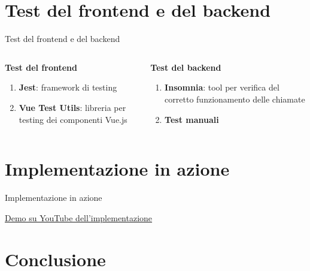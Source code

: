 \documentclass[aspectratio=169]{beamer}
\begin{document}
\section{Test del frontend e del backend}

\begin{frame}{Test del frontend e del backend}
	\begin{columns}[T] %
		\begin{column}{0.5\textwidth}
			\textbf{Test del frontend}
			\begin{enumerate}
				\item \textbf{Jest}: framework di testing
				\item \textbf{Vue Test Utils}: libreria per testing dei componenti Vue.js
			\end{enumerate}
		\end{column}
		\begin{column}{0.5\textwidth}
			\textbf{Test del backend}
			\begin{enumerate}
				\item \textbf{Insomnia}: tool per verifica del corretto funzionamento delle chiamate
				\item \textbf{Test manuali}
			\end{enumerate}
		\end{column}
	\end{columns}
\end{frame}

\section{Implementazione in azione}
\begin{frame}{Implementazione in azione}
	\begin{center}
		 \href{https://youtu.be/P-cb9pAs8Go}{Demo su YouTube dell'implementazione}
	\end{center}
\end{frame}

\section{Conclusione}
\end{document}
